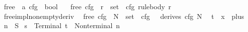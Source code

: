 %
\begin{isabellebody}%
%
%
\isadelimtheory
%
\endisadelimtheory
%
\isatagtheory
%
\endisatagtheory
{\isafoldtheory}%
%
\isadelimtheory
%
\endisadelimtheory
%
\isadelimdocument
%
\endisadelimdocument
%
\isatagdocument
%
\isamarkuptrue%
%
\isamarkuptrue%
%
\endisatagdocument
{\isafolddocument}%
%
\isadelimdocument
%
\endisadelimdocument
{}\isamarkupfalse%
\ {\isasymepsilon}{\isacharunderscore}{\kern0pt}free\ {\isacharcolon}{\kern0pt}{\isacharcolon}{\kern0pt}\ {\isachardoublequoteopen}{\isacharprime}{\kern0pt}a\ cfg\ {\isasymRightarrow}\ bool{\isachardoublequoteclose}\ \isanewline
\ \ {\isachardoublequoteopen}{\isasymepsilon}{\isacharunderscore}{\kern0pt}free\ cfg\ {\isasymlongleftrightarrow}\ {\isacharparenleft}{\kern0pt}{\isasymforall}r\ {\isasymin}\ set\ {\isacharparenleft}{\kern0pt}{\isasymRR}\ cfg{\isacharparenright}{\kern0pt}{\isachardot}{\kern0pt}\ rule{\isacharunderscore}{\kern0pt}body\ r\ {\isasymnoteq}\ {\isacharbrackleft}{\kern0pt}{\isacharbrackright}{\kern0pt}{\isacharparenright}{\kern0pt}{\isachardoublequoteclose}\isanewline
\isanewline
{}\isamarkupfalse%
\ {\isasymepsilon}{\isacharunderscore}{\kern0pt}free{\isacharunderscore}{\kern0pt}impl{\isacharunderscore}{\kern0pt}non{\isacharunderscore}{\kern0pt}empty{\isacharunderscore}{\kern0pt}deriv{\isacharcolon}{\kern0pt}\isanewline
\ \ {\isachardoublequoteopen}{\isasymepsilon}{\isacharunderscore}{\kern0pt}free\ cfg\ {\isasymLongrightarrow}\ N\ {\isasymin}\ set\ {\isacharparenleft}{\kern0pt}{\isasymNN}\ cfg{\isacharparenright}{\kern0pt}\ {\isasymLongrightarrow}\ {\isasymnot}\ derives\ cfg\ {\isacharbrackleft}{\kern0pt}N{\isacharbrackright}{\kern0pt}\ {\isacharbrackleft}{\kern0pt}{\isacharbrackright}{\kern0pt}{\isachardoublequoteclose}%
\isadelimproof
%
\endisadelimproof
%
\isatagproof
%
\endisatagproof
{\isafoldproof}%
%
\isadelimproof
%
\endisadelimproof
%
\isadelimdocument
%
\endisadelimdocument
%
\isatagdocument
%
\isamarkuptrue%
%
\endisatagdocument
{\isafolddocument}%
%
\isadelimdocument
%
\endisadelimdocument
{}\isamarkupfalse%
\ t{}\ {\isacharequal}{\kern0pt}\ x\ {\isacharbar}{\kern0pt}\ plus\isanewline
{}\isamarkupfalse%
\ n{}\ {\isacharequal}{\kern0pt}\ S\isanewline
{}\isamarkupfalse%
\ s{}\ {\isacharequal}{\kern0pt}\ Terminal\ t{}\ {\isacharbar}{\kern0pt}\ Nonterminal\ n{}\isanewline

\end{isabellebody}
